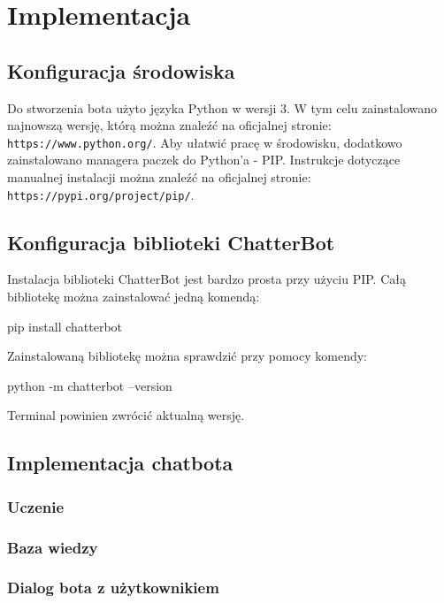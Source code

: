 \chapter{Implementacja}

\section{Konfiguracja środowiska}
Do stworzenia bota użyto języka Python w wersji 3. W tym celu zainstalowano najnowszą wersję, którą można znaleźć na oficjalnej stronie: \texttt{https://www.python.org/}.
Aby ułatwić pracę w środowisku, dodatkowo zainstalowano managera paczek do Python’a - PIP. Instrukcje dotyczące manualnej instalacji można znaleźć na oficjalnej stronie: \texttt{https://pypi.org/project/pip/}.

\section{Konfiguracja biblioteki ChatterBot}
Instalacja biblioteki ChatterBot jest bardzo prosta przy użyciu PIP. Całą bibliotekę można zainstalować jedną komendą:

\begin{center}
pip install chatterbot
\end{center}

Zainstalowaną bibliotekę można sprawdzić przy pomocy komendy:

\begin{center}
python -m chatterbot --version
\end{center}

Terminal powinien zwrócić aktualną wersję.

\section{Implementacja chatbota}

\subsection{Uczenie}
\subsection{Baza wiedzy}
\subsection{Dialog bota z użytkownikiem}
